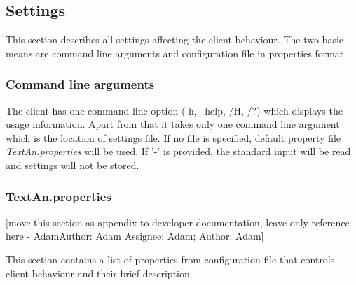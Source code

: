 \documentclass[12pt,a4paper]{report}
\makeatletter
\newcommand{\comment}[3][\@empty]{
  {\color{magenta}[#3 - }
  {\color{green}\ifx\@empty#1\relax Author: #2 \else Assignee: #1; Author: #2\fi}{\color{magenta}]}
}
\makeatother
\begin{document}
\subsection{Settings}

This section describes all settings affecting the client behaviour.
The two basic means are command line arguments and configuration file in properties format.

\subsubsection{Command line arguments}
\label{ssec:CliCmdArg}

The client has one command line option (-h, --help, /H, /?) which displays the usage information.
Apart from that it takes only one command line argument which is the location of settings file.
If no file is specified, default property file \emph{TextAn.properties} will be used.
If '-' is provided, the standard input will be read and settings will not be stored.

\subsubsection{TextAn.properties}

\comment[Adam]{Adam}{move this section as appendix to developer documentation, leave only reference here}
This section contains a list of properties from configuration file that controls
client behaviour and their brief description.
\end{document}
